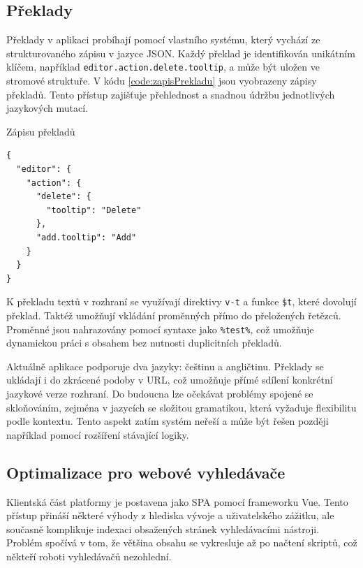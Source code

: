 \subsection{Překlady}

Překlady v aplikaci probíhají pomocí vlastního systému, který vychází ze strukturovaného zápisu v jazyce JSON. 
Každý překlad je identifikován unikátním klíčem, například \texttt{editor.action.delete.tooltip}, a může být uložen ve stromové struktuře. 
V kódu \ref{code:zapisPrekladu} jsou vyobrazeny zápisy překladů.
Tento přístup zajišťuje přehlednost a snadnou údržbu jednotlivých jazykových mutací.


\begin{listing}[ht!]
\caption{Zápisu překladů}\label{code:zapisPrekladu}
\begin{verbatim}
{
  "editor": {
    "action": {
      "delete": {
        "tooltip": "Delete"
      },
      "add.tooltip": "Add"
    }
  }
}
\end{verbatim}
\end{listing}

K překladu textů v rozhraní se využívají direktivy \texttt{v-t} a funkce \texttt{\$t}, které dovolují překlad.
Taktéž umožňují vkládání proměnných přímo do přeložených řetězců. 
Proměnné jsou nahrazovány pomocí syntaxe jako \texttt{\%test\%}, což umožňuje dynamickou práci s obsahem bez nutnosti duplicitních překladů.

Aktuálně aplikace podporuje dva jazyky: češtinu a angličtinu. 
Překlady se ukládají i do zkrácené podoby v URL, což umožňuje přímé sdílení konkrétní jazykové verze rozhraní. 
Do budoucna lze očekávat problémy spojené se skloňováním, zejména v jazycích se složitou gramatikou, která vyžaduje flexibilitu podle kontextu. 
Tento aspekt zatím systém neřeší a může být řešen později například pomocí rozšíření stávající logiky.


\subsection{Optimalizace pro webové vyhledávače}

Klientská část platformy je postavena jako SPA pomocí frameworku Vue. 
Tento přístup přináší některé výhody z hlediska vývoje a uživatelského zážitku, ale současně komplikuje indexaci obsažených stránek vyhledávacími nástroji. 
Problém spočívá v tom, že většina obsahu se vykresluje až po načtení skriptů, což někteří roboti vyhledávačů nezohlední.

